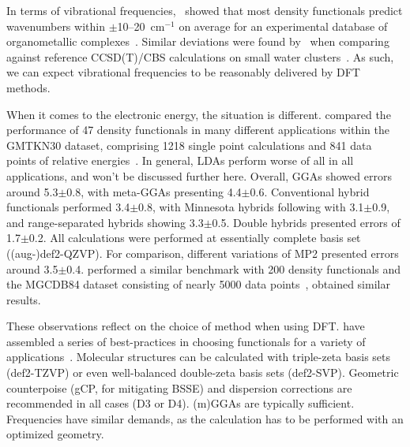 In terms of vibrational frequencies,~\citeauthor{Katari_2017} showed that most density functionals
predict wavenumbers within $\pm$10--20~cm$^{-1}$ on average for
an experimental database of organometallic complexes~\cite{Katari_2017}.
Similar deviations were found by~\citeauthor{Howard_2015}
when comparing against reference CCSD(T)/CBS calculations on
small water clusters~\cite{Howard_2015}.
As such,
we can expect vibrational frequencies to be reasonably delivered
by DFT methods.

When it comes to the electronic energy,
the situation is different.
\citeauthor{Goerigk_2011} compared the performance of 47 density functionals
in many different applications
within the GMTKN30 dataset,
comprising 1218 single point calculations
and 841 data points of relative energies~\cite{Goerigk_2011}.
In general,
LDAs perform worse of all in all applications,
and won't be discussed further here.
Overall,
GGAs showed errors around 5.3$\pm$0.8\kcalmol,
with meta-GGAs presenting 4.4$\pm$0.6\kcalmol.
Conventional hybrid functionals performed 3.4$\pm$0.8\kcalmol,
with Minnesota hybrids following with 3.1$\pm$0.9\kcalmol,
and range-separated hybrids showing 3.3$\pm$0.5\kcalmol.
Double hybrids presented errors of 1.7$\pm$0.2\kcalmol.
All calculations were performed at essentially complete basis set
((aug-)def2-QZVP).
For comparison,
different variations of MP2
presented errors around 3.5$\pm$0.4\kcalmol.
\citeauthor{Mardirossian_2017} performed a similar
benchmark with 200 density functionals and the MGCDB84 dataset
consisting of nearly 5000 data points~\cite{Mardirossian_2017},
obtained similar results.

These observations reflect on the choice of method when using DFT.\@
\citeauthor{Bursch_2022} have assembled a series of best-practices in choosing functionals for a variety of applications~\cite{Bursch_2022}.
Molecular structures can be calculated with triple-zeta basis sets (def2-TZVP)
or even well-balanced double-zeta basis sets (def2-SVP).
Geometric counterpoise (gCP,
for mitigating BSSE) and dispersion corrections are recommended in all cases (D3 or D4).
(m)GGAs are typically sufficient.
Frequencies have similar demands,
as the calculation has to be performed with an optimized geometry.

